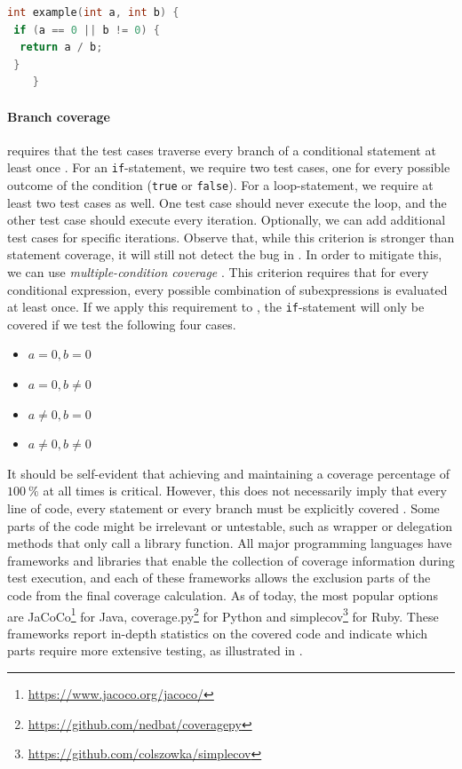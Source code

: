 \begin{lstlisting}[caption=Example of irrelevant statement coverage in C.,label=lst:statement-coverage-fail,language=C]
	int example(int a, int b) {
 if (a == 0 || b != 0) {
  return a / b;
 }
	}
\end{lstlisting}

\paragraph*{Branch coverage} requires that the test cases traverse every branch of a conditional statement at least once  \cite[p.~37]{Myers:2011:AST:2161638}. For an \texttt{if}-statement, we require two test cases, one for every possible outcome of the condition (\texttt{true} or \texttt{false}). For a loop-statement, we require at least two test cases as well. One test case should never execute the loop, and the other test case should execute every iteration. Optionally, we can add additional test cases for specific iterations. Observe that, while this criterion is stronger than statement coverage, it will still not detect the bug in . In order to mitigate this, we can use \emph{multiple-condition coverage} \cite[p.~40]{Myers:2011:AST:2161638}. This criterion requires that for every conditional expression, every possible combination of subexpressions is evaluated at least once. If we apply this requirement to , the \texttt{if}-statement will only be covered if we test the following four cases.

\begin{itemize}
	\item $a = 0, b = 0$
	\item $a = 0, b \neq 0$
	\item $a \neq 0, b = 0$
	\item $a \neq 0, b \neq 0$
\end{itemize}

\noindent It should be self-evident that achieving and maintaining a coverage percentage of $\SI{100}{\percent}$ at all times is critical. However, this does not necessarily imply that every line of code, every statement or every branch must be explicitly covered \cite{dein_2019}. Some parts of the code might be irrelevant or untestable, such as wrapper or delegation methods that only call a library function. All major programming languages have frameworks and libraries that enable the collection of coverage information during test execution, and each of these frameworks allows the exclusion parts of the code from the final coverage calculation. As of today, the most popular options are JaCoCo\footnote{\url{https://www.jacoco.org/jacoco/}} for Java, coverage.py\footnote{\url{https://github.com/nedbat/coveragepy}} for Python and simplecov\footnote{\url{https://github.com/colszowka/simplecov}} for Ruby. These frameworks report in-depth statistics on the covered code and indicate which parts require more extensive testing, as illustrated in .

